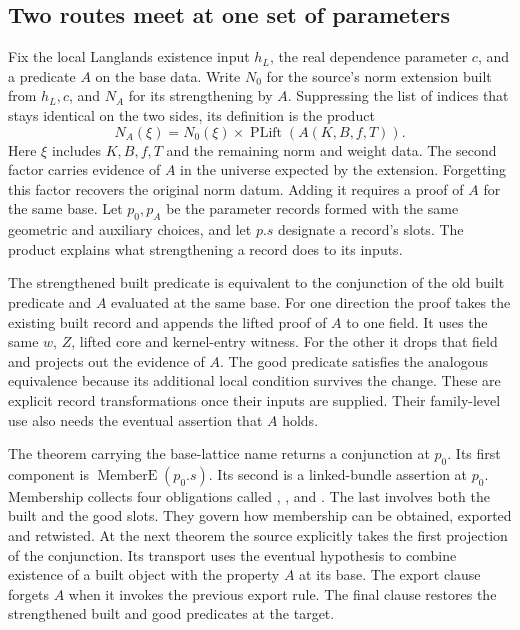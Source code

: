 \documentclass[12pt,letterpaper]{article}
\begin{document}
\subsection{Two routes meet at one set of parameters}
Fix the local Langlands existence input $h_L$, the real dependence parameter $c$, and a predicate $A$ on the base data. Write $N_0$ for the source's norm extension built from $h_L,c$, and $N_A$ for its strengthening by $A$. Suppressing the list of indices that stays identical on the two sides, its definition is the product
\[
             N_A(\xi)=N_0(\xi)\times \operatorname{PLift}(A(K,B,f,T)).
\]
Here $\xi$ includes $K,B,f,T$ and the remaining norm and weight data. The second factor carries evidence of $A$ in the universe expected by the extension. Forgetting this factor recovers the original norm datum. Adding it requires a proof of $A$ for the same base. Let $p_0,p_A$ be the parameter records formed with the same geometric and auxiliary choices, and let $p.s$ designate a record's slots. The product explains what strengthening a record does to its inputs. 

The strengthened built predicate is equivalent to the conjunction of the old built predicate and $A$ evaluated at the same base. For one direction the proof takes the existing built record and appends the lifted proof of $A$ to one field. It uses the same $w$, $Z$, lifted core and kernel-entry witness. For the other it drops that field and projects out the evidence of $A$. The good predicate satisfies the analogous equivalence because its additional local condition survives the change. These are explicit record transformations once their inputs are supplied. Their family-level use also needs the eventual assertion that $A$ holds. 

The theorem carrying the base-lattice name returns a conjunction at $p_0$. Its first component is $\operatorname{MemberE}(p_0.s)$. Its second is a linked-bundle assertion at $p_0$. Membership collects four obligations called , ,  and . The last involves both the built and the good slots. They govern how membership can be obtained, exported and retwisted. At the next theorem the source explicitly takes the first projection of the conjunction. Its transport uses the eventual hypothesis to combine existence of a built object with the property $A$ at its base. The export clause forgets $A$ when it invokes the previous export rule. The final clause restores the strengthened built and good predicates at the target.   
\end{document}
